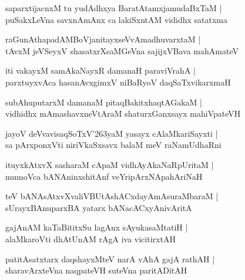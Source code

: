 \documentclass[twoside,12pt,openright]{book}
\def\S{\char'263}
\newcounter{shloka}[chapter]
\begin{document}
\begin{shloka}%
saparxtijacnxM tu yudAdhxya BaratAtamxjamudaBxTaM |\\
puSakxLeVna savxnAmAnx ca lakiSxntAM vididhx satatxma
\end{shloka}

\begin{shloka}%
raGunAthapadAMBoVjanitayxseVvAmadhuvarxtaM |\\
tAvxM jeVSeyxV shasatxrXsaMGeVna sajijxVBava mahAmateV 
\end{shloka}

\begin{shloka}%
iti vakayxM samAkaNayxR damanaH paraviVrahA |\\
parxtuyxvAca hasanAvxgimxV niBaRyoV daqSaTxvikarxmaH 
\end{shloka}

\begin{shloka}%
subAhuputarxM damanaM pitaqBakitxhaqtAGakaM |\\
vidhidhx mAmashavxneVtAraM shaturxGanxsayx mahiVpateVH 
\end{shloka}

\begin{shloka}%
jayoV deVvavisaqSoTxV\S yaM yasayx cAlaMkariSayxti |\\
sa pArxponxVti niriVkaSxsavx balaM meV raNamUdhaRni
\end{shloka}

\begin{shloka}%
ituyxkAtxvX sasharaM cApaM vidhAyAkaNaRpUritaM |\\
mumoVca bANAninxshitAnf veYripArxNApahAriNaH
\end{shloka}

\begin{shloka}%
teV bANAsAtxvXvaliVBUtAshACxdayAmAsuraMbaraM |\\
sUrayxBAnuparxBA yatarx bANacACxyAnivAritA 
\end{shloka}

\begin{shloka}%
gajAnAM kaTaBititxSu lagAnx sAyukasaMtatiH |\\
alaMkaroVti dhAtUnAM rAgA iva vicitirxtAH 
\end{shloka}

\begin{shloka}%
patitAsatxtarx daqshayxMteV narA vAhA gajA rathAH |\\
sharavArxteVna naqpateVH suteVna paritADitAH 
\end{shloka}
\end{document}
